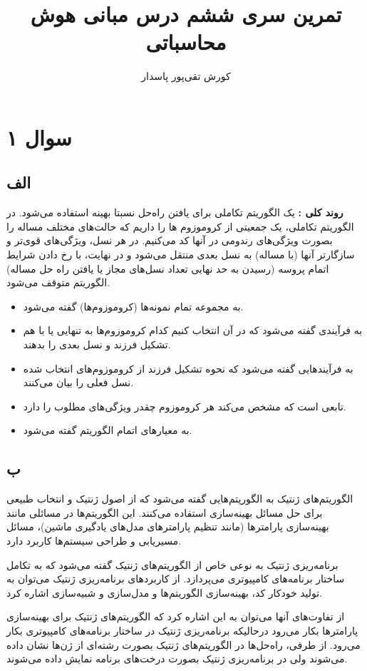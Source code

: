 \documentclass[12pt]{article}
\title{تمرین سری ششم درس مبانی هوش محاسباتی}
\author{کورش تقی‌پور پاسدار}
\begin{document}
	\maketitle
	\section{سوال ۱}
	\subsection{الف}
	\textbf{روند کلی :} یک الگوریتم تکاملی برای یافتن راه‌حل نسبتا بهینه استفاده می‌شود. در الگوریتم تکاملی، یک جمعیتی از کروموزوم ها را داریم که حالت‌های مختلف مساله را بصورت ویژگی‌های رندومی در آنها کد می‌کنیم. در هر نسل، ویژگی‌های قوی‌تر و سازگارتر آنها (با مساله) به نسل بعدی منتقل می‌شود و در نهایت، با رخ دادن شرایط اتمام پروسه (رسیدن به حد نهایی تعداد نسل‌های مجاز یا یافتن راه حل مساله) الگوریتم متوقف می‌شود.
	 \begin{itemize}
	 	\item {} به مجموعه تمام نمونه‌ها (کروموزوم‌ها) گفته می‌شود.
	 	\item {} به فرآیندی گفته می‌شود که در آن انتخاب کنیم کدام کروموزوم‌ها به تنهایی یا با هم تشکیل فرزند و نسل بعدی را بدهند.
	 	\item {} به فرآیندهایی گفته می‌شود که نحوه تشکیل فرزند از کروموزوم‌های انتخاب شده نسل فعلی را  بیان می‌کنند.
	 	\item {} تابعی است که مشخص می‌کند هر کروموزوم چقدر ویژگی‌های مطلوب را دارد.
	 	\item {} به معیارهای اتمام الگوریتم گفته می‌شود.
	 \end{itemize}
	 \subsection{ب}
	 الگوریتم‌های ژنتیک به الگوریتم‌هایی گفته می‌شود که از اصول ژنتیک و انتخاب طبیعی برای حل مسائل بهینه‌سازی استفاده می‌کنند. این الگوریتم‌ها در مسائلی مانند بهینه‌سازی پارامترها (مانند تنظیم پارامترهای مدل‌های یادگیری ماشین)، مسائل مسیریابی و طراحی سیستم‌ها کاربرد دارد. 
	 
	 برنامه‌ریزی ژنتیک به نوعی خاص از الگوریتم‌های ژنتیک گفته می‌شود که به تکامل ساختار برنامه‌های کامپیوتری می‌پردازد. از  کاربردهای برنامه‌ریزی ژنتیک می‌توان به تولید خودکار کد، بهینه‌سازی الگوریتم‌ها و مدل‌سازی و شبیه‌سازی اشاره کرد.
	 
	 از تفاوت‌های آنها می‌توان به این اشاره کرد که الگوریتم‌های ژنتیک برای بهینه‌سازی پارامترها بکار می‌رود درحالیکه برنامه‌ریزی ژنتیک در ساختار برنامه‌های کامپیوتری بکار می‌رود. از طرفی، راه‌حل‌ها در الگوریتم‌های ژنتیک بصورت رشته‌ای از ژن‌ها نشان داده می‌شوند ولی در برنامه‌ریزی ژنتیک بصورت درخت‌های برنامه نمایش داده می‌شوند.
\end{document}
